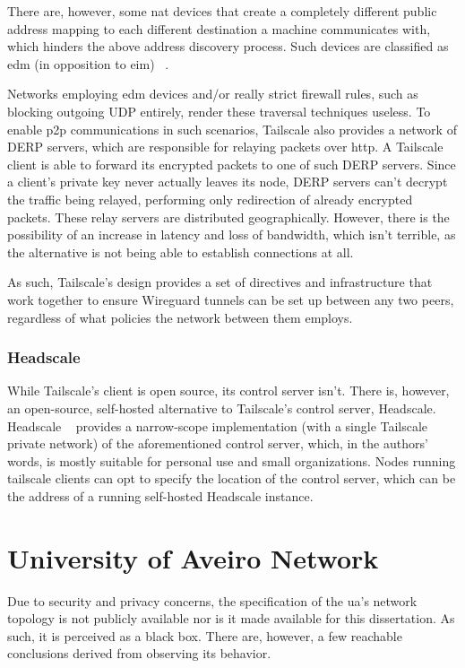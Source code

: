 \documentclass[11pt,twoside,a4paper]{report}
\begin{document}
There are, however, some \ac{nat} devices that create a completely different public address mapping to each different destination a machine communicates with, which hinders the above address discovery process. Such devices are classified as \ac{edm} (in opposition to \ac{eim}) ~\cite{rfc4787}.

Networks employing \ac{edm} devices and/or really strict firewall rules, such as blocking outgoing UDP entirely, render these traversal techniques useless. To enable \ac{p2p} communications in such scenarios, Tailscale also provides a network of \ac{DERP} servers, which are responsible for relaying packets over \ac{http}. A Tailscale client is able to forward its encrypted packets to one of such \ac{DERP} servers. Since a client's private key never actually leaves its node, \ac{DERP} servers can't decrypt the traffic being relayed, performing only redirection of already encrypted packets. These relay servers are distributed geographically. However, there is the possibility of an increase in latency and loss of bandwidth, which isn't terrible, as the alternative is not being able to establish connections at all.

As such, Tailscale's design provides a set of directives and infrastructure that work together to ensure Wireguard tunnels can be set up between any two peers, regardless of what policies the network between them employs.

\subsubsection{Headscale}
\label{sec:hs}

While Tailscale's client is open source, its control server isn't. There is, however, an open-source, self-hosted alternative to Tailscale's control server, Headscale. Headscale ~\cite{headscale2023online} provides a narrow-scope implementation (with a single Tailscale private network) of the aforementioned control server, which, in the authors' words, is mostly suitable for personal use and small organizations. Nodes running tailscale clients can opt to specify the location of the control server, which can be the address of a running self-hosted Headscale instance.

\section{University of Aveiro Network}

Due to security and privacy concerns, the specification of the \ac{ua}'s network topology is not publicly available nor is it made available for this dissertation. As such, it is perceived as a black box. There are, however, a few reachable conclusions derived from observing its behavior.
\end{document}
